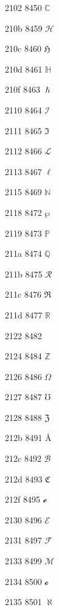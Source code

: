 \documentclass[11pt]{article}
\begin{document}


2102 8450 \ensuremath{\mathbb{C}}


210b 8459 \ensuremath{\mathscr{H}}

210c 8460 \ensuremath{\mathfrak{H}}

210d 8461 \ensuremath{\mathbb{H}}

210f 8463 \ensuremath{\hslash}

2110 8464 \ensuremath{\mathscr{I}}

2111 8465 \ensuremath{\Im}

2112 8466 \ensuremath{\mathscr{L}}

2113 8467 \ensuremath{\ell}

2115 8469 \ensuremath{\mathbb{N}}


2118 8472 \ensuremath{\wp}

2119 8473 \ensuremath{\mathbb{P}}

211a 8474 \ensuremath{\mathbb{Q}}

211b 8475 \ensuremath{\mathscr{R}}

211c 8476 \ensuremath{\Re}

211d 8477 \ensuremath{\mathbb{R}}


2122 8482 \texttrademark

2124 8484 \ensuremath{\mathbb{Z}}

2126 8486 \ensuremath{\Omega}

2127 8487 \ensuremath{\mho}

2128 8488 \ensuremath{\mathfrak{Z}}


212b 8491 \AA

212c 8492 \ensuremath{\mathscr{B}}

212d 8493 \ensuremath{\mathfrak{C}}

212f 8495 \ensuremath{\mathscr{e}}

2130 8496 \ensuremath{\mathscr{E}}

2131 8497 \ensuremath{\mathscr{F}}

2133 8499 \ensuremath{\mathscr{M}}

2134 8500 \ensuremath{\mathscr{o}}

2135 8501 \ensuremath{\aleph}
\end{document}
